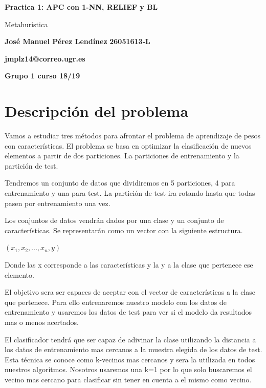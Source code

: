 \documentclass[titlepage]{article}
\begin{document}
	\begin{titlepage}
		\begin{center}
			\vspace*{1cm}
			\date{} %
			\Huge
			\textbf{Practica 1: APC con 1-NN, RELIEF y BL}
			
			\vspace{0.5cm}
			\LARGE
			Metahurística
			
			\vspace{1.5cm}
			
			\textbf{José Manuel Pérez Lendínez}
			\textbf{26051613-L}\newline
			
			\textbf{jmplz14@correo.ugr.es}		

					
			\textbf{Grupo 1 curso 18/19}
			

			
		\end{center}
	\newpage
	\tableofcontents
	\newpage
	\end{titlepage}
	\section{Descripción del problema}
	Vamos a estudiar tres métodos para afrontar el problema de aprendizaje de pesos con características. El problema se basa en optimizar la clasificación de nuevos elementos a partir de dos particiones. La particiones de entrenamiento y la partición de test.
	 
	Tendremos un conjunto de datos que dividiremos en 5 particiones, 4 para entrenamiento y una para test. La partición de test ira rotando hasta que todas pasen por entrenamiento una vez. 
	
	Los conjuntos de datos vendrán dados por una clase y un conjunto de características. Se representarán como un vector con la siguiente estructura.
	\begin{center}
		$(x_1, x_2, ... , x_n, y)$
	\end{center}

	Donde las x corresponde a las características y la y a la clase que pertenece ese elemento.
	
	El objetivo sera ser capaces de aceptar con el vector de características a la clase que pertenece. Para ello entrenaremos nuestro modelo con los datos de entrenamiento y usaremos los datos de test para ver si el modelo da resultados mas o menos acertados.
	
	El clasificador tendrá que ser capaz de adivinar la clase utilizando la distancia a los datos de entrenamiento mas cercanos a la muestra elegida de los datos de test. Esta técnica se conoce como k-vecinos mas cercanos y sera la utilizada en todos nuestros algoritmos. Nosotros usaremos una k=1 por lo que solo buscaremos el vecino mas cercano para clasificar sin tener en cuenta a el mismo como vecino.
	
\end{document}
